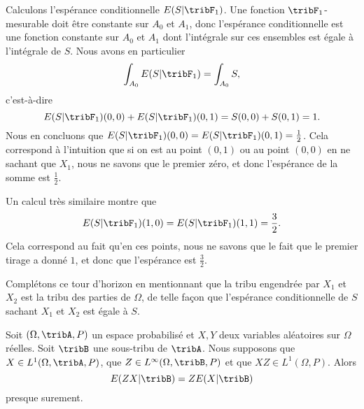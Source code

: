 \begin{example}
    Calculons l'espérance conditionnelle \( E(S|\tribF_1)\). Une fonction \( \tribF_1\)-mesurable doit être constante sur \( A_0\) et \( A_1\), donc l'espérance conditionnelle est une fonction constante sur \( A_0\) et \( A_1\) dont l'intégrale sur ces ensembles est égale à l'intégrale de \( S\). Nous avons en particulier
    \begin{equation}
        \int_{A_0}E(S|\tribF_1)=\int_{A_0}S,
    \end{equation}
    c'est-à-dire
    \begin{equation}
        E(S|\tribF_1)(0,0)+E(S|\tribF_1)(0,1)=S(0,0)+S(0,1)=1.
    \end{equation}
    Nous en concluons que \( E(S|\tribF_1)(0,0)=E(S|\tribF_1)(0,1)=\frac{ 1 }{2}\). Cela correspond à l'intuition que si on est au point \( (0,1)\) ou au point \( (0,0)\) en ne sachant que \( X_1\), nous ne savons que le premier zéro, et donc l'espérance de la somme est \( \frac{ 1 }{2}\).

    Un calcul très similaire montre que
    \begin{equation}
        E(S|\tribF_1)(1,0)=E(S|\tribF_1)(1,1)=\frac{ 3 }{2}.
    \end{equation}
    Cela correspond au fait qu'en ces points, nous ne savons que le fait que le premier tirage a donné \( 1\), et donc que l'espérance est \( \frac{ 3 }{2}\).

    Complétons ce tour d'horizon en mentionnant que la tribu engendrée par \( X_1\) et \( X_2\) est la tribu des parties de \( \Omega\), de telle façon que l'espérance conditionnelle de \( S\) sachant \( X_1\) et \( X_2\) est égale à \( S\).
\end{example}

\begin{proposition}   \label{PropRNBtfql}
    Soit \( (\Omega,\tribA,P)\) un espace probabilisé et \( X,Y\) deux variables aléatoires sur \( \Omega\) réelles. Soit \( \tribB\) une sous-tribu de \( \tribA\). Nous supposons que \( X\in L^1(\Omega,\tribA,P)\), que \( Z\in L^{\infty}(\Omega,\tribB,P)\) et que \( XZ\in L^1(\Omega,P)\). Alors
    \begin{equation}
        E(ZX|\tribB)=ZE(X|\tribB)
    \end{equation}
    presque surement.
\end{proposition}

